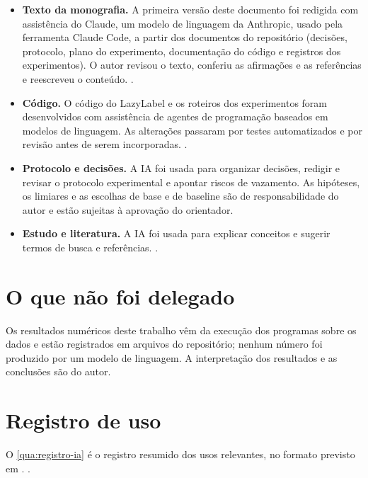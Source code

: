 \begin{itemize}
  \item \textbf{Texto da monografia.} A primeira versão deste documento foi redigida com assistência do Claude, um modelo de linguagem da Anthropic, usado pela ferramenta Claude Code, a partir dos documentos do repositório (decisões, protocolo, plano do experimento, documentação do código e registros dos experimentos). O autor revisou o texto, conferiu as afirmações e as referências e reescreveu o conteúdo. .
  \item \textbf{Código.} O código do LazyLabel e os roteiros dos experimentos foram desenvolvidos com assistência de agentes de programação baseados em modelos de linguagem. As alterações passaram por testes automatizados e por revisão antes de serem incorporadas. .
  \item \textbf{Protocolo e decisões.} A IA foi usada para organizar decisões, redigir e revisar o protocolo experimental e apontar riscos de vazamento. As hipóteses, os limiares e as escolhas de base e de baseline são de responsabilidade do autor e estão sujeitas à aprovação do orientador.
  \item \textbf{Estudo e literatura.} A IA foi usada para explicar conceitos e sugerir termos de busca e referências. .
\end{itemize}

\section{O que não foi delegado}

Os resultados numéricos deste trabalho vêm da execução dos programas sobre os dados e estão registrados em arquivos do repositório; nenhum número foi produzido por um modelo de linguagem. A interpretação dos resultados e as conclusões são do autor.

\section{Registro de uso}

O \autoref{qua:registro-ia} é o registro resumido dos usos relevantes, no formato previsto em . .


